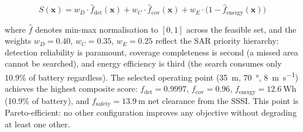 \begin{equation}\label{eq:composite}
  S(\mathbf{x}) = w_D \cdot \hat{f}_{\mathrm{det}}(\mathbf{x}) + w_C \cdot \hat{f}_{\mathrm{cov}}(\mathbf{x}) + w_E \cdot \bigl(1 - \hat{f}_{\mathrm{energy}}(\mathbf{x})\bigr)
\end{equation}

\noindent where $\hat{f}$ denotes min-max normalisation to $[0, 1]$ across the feasible set, and the weights $w_D = 0.40$, $w_C = 0.35$, $w_E = 0.25$ reflect the SAR priority hierarchy: detection reliability is paramount, coverage completeness is second (a missed area cannot be searched), and energy efficiency is third (the search consumes only 10.9\% of battery regardless). The selected operating point (\SI{35}{\metre}, \SI{70}{\degree}, \SI{8}{\metre\per\second}) achieves the highest composite score: $f_{\mathrm{det}} = 0.9997$, $f_{\mathrm{cov}} = 0.96$, $f_{\mathrm{energy}} = \SI{12.6}{\watt\hour}$ (10.9\% of battery), and $f_{\mathrm{safety}} = \SI{13.9}{\metre}$ net clearance from the SSSI. This point is Pareto-efficient: no other configuration improves any objective without degrading at least one other.
